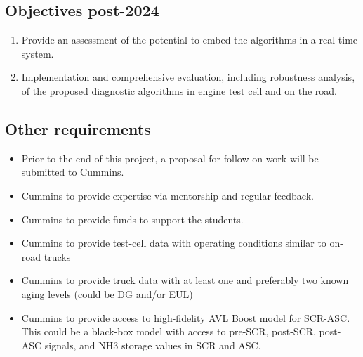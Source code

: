 \subsection{Objectives post-2024}
\begin{enumerate}
    \item Provide an assessment of the potential to embed the algorithms in a real-time system.
    \item Implementation and comprehensive evaluation, including robustness analysis, of the proposed diagnostic algorithms in engine test cell and on the road.
\end{enumerate}


\subsection{Other requirements}
\begin{itemize}
    \item Prior to the end of this project, a proposal for follow-on work will be submitted to Cummins.
    \item Cummins to provide expertise via mentorship and regular feedback.
    \item Cummins to provide funds to support the students.
    \item Cummins to provide test-cell data with operating conditions similar to on-road trucks
    \item Cummins to provide truck data with at least one and preferably two known aging levels (could be DG and/or EUL)
    \item Cummins to provide access to high-fidelity AVL Boost model for SCR-ASC. This could be a black-box model with access to pre-SCR, post-SCR, post-ASC signals, and NH3 storage values in SCR and ASC.
\end{itemize}
